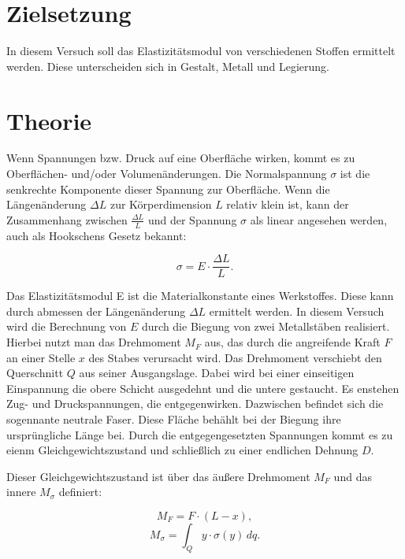 \section{Zielsetzung}
\label{Zielsetzung}
In diesem Versuch soll das Elastizitätsmodul von verschiedenen Stoffen ermittelt werden.
Diese unterscheiden sich in Gestalt, Metall und Legierung.

\section{Theorie}
\label{Theorie}
Wenn Spannungen bzw. Druck auf eine Oberfläche wirken, kommt es zu Oberflächen- und/oder Volumenänderungen.
Die Normalspannung $\sigma$ ist die senkrechte Komponente dieser Spannung zur Oberfläche.
Wenn die Längenänderung $\Delta L$ zur Körperdimension $L$ relativ klein ist, kann der Zusammenhang zwischen $\frac{\Delta L}{L}$ und der Spannung $\sigma$ als linear angesehen werden, auch als Hookschens Gesetz bekannt:

\begin{equation}
    \sigma = E  \cdot \frac{\Delta L}{L} .
\end{equation}

Das Elastizitätsmodul E ist die Materialkonstante eines Werkstoffes.
Diese kann durch abmessen der Längenänderung $\Delta L$ ermittelt werden.
In diesem Versuch wird die Berechnung von $E$ durch die Biegung von zwei Metallstäben realisiert.
Hierbei nutzt man das Drehmoment $M_F$ aus, das durch die angreifende Kraft $F$ an einer Stelle $x$ des Stabes verursacht wird.
Das Drehmoment verschiebt den Querschnitt $Q$ aus seiner Ausgangslage.
Dabei wird bei einer einseitigen Einspannung die obere Schicht ausgedehnt und die untere gestaucht.
Es enstehen Zug- und Druckspannungen, die entgegenwirken.
Dazwischen befindet sich die sogennante neutrale Faser.
Diese Fläche behählt bei der Biegung ihre ursprüngliche Länge bei.
Durch die entgegengesetzten Spannungen kommt es zu eienm Gleichgewichtszustand und schließlich zu einer endlichen Dehnung $D$.

Dieser Gleichgewichtszustand ist über das äußere Drehmoment $M_F$ und das innere $M_\sigma$ definiert:

\begin{equation}
    M_F = F \cdot (L - x) ,
\end{equation}
\begin{equation}
    M_\sigma = \int_{Q} y \cdot \sigma(y)\, dq .
\end{equation}


